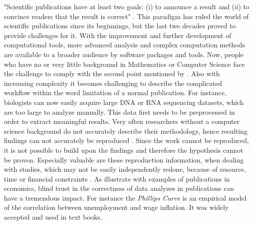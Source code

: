 "Scientific publications have at least two goals: (i) to announce a result and (ii) to convince readers that the result is correct" \citep{Mesirov2010}.
This paradigm has ruled the world of scientific publications since its beginnings, but the last two decades proved to provide challenges for it. With the improvement and further development of computational tools, more advanced analysis and complex computation methods are available to a broader audience by software packages and tools. Now, people who have no or very little background in Mathematics or Computer Science face the challenge to comply with the second point mentioned by \citeauthor{Mesirov2010}. Also with increasing complexity it becomes challenging to describe the complicated workflow within the word limitation of a normal publication.
For instance, biologists can now easily acquire large DNA or RNA sequencing datasets, which  are too large to analyze manually.
This data first needs to be preprocessed in order to extract meaningful results. %
Very often researchers without a computer science background do not accurately describe their methodology, hence resulting findings can not accurately be reproduced \citep{Peng2011}.
Since the work cannot be reproduced, it is not possible to build upon the findings and therefore the hypothesis cannot be proven.
Especially valuable are these reproduction information, when dealing with studies, which may not be easily independently redone, because of resource, time or financial constraints \citep{Peng2011}.
As \citeauthor{McCullough2008} illustrate with examples of publications in economics, blind trust in the correctness of data analyzes in publications can have a tremendous impact. For instance the \emph{Phillips Curve} \citep{Phillips1958} is an empirical model of the correlation between unemployment and wage inflation. It was widely accepted and used in text books.
